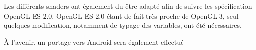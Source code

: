 \documentclass[10pt,a4paper,twoside, twocolumn]{report}
\newcommand*{\rootPath}{../}
\begin{document}
Les différents shaders ont également du être adapté afin de suivre les spécification OpenGL ES $2.0$. OpenGL ES $2.0$ étant de fait très proche de OpenGL $3$, seul quelques modification, notamment de typage des variables, ont été nécessaires.

À l'avenir, un portage vers Android sera également effectué

\ifstandalone
	
	
\fi
\end{document}

